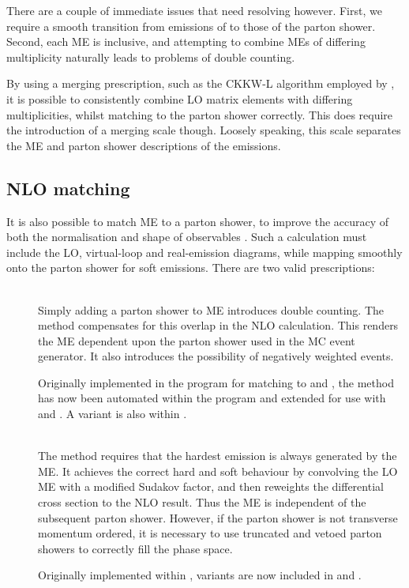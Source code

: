There are a couple of immediate issues that need resolving however. First, we require a 
smooth transition from emissions of  to those of the parton shower. Second, each 
\ac{ME} is inclusive, and attempting to combine \acp{ME} of differing multiplicity 
naturally leads to problems of double counting.

By using a merging prescription, such as the CKKW-L algorithm \cite{CKKW,Lonnblad:2002} 
employed by \sherpa, it is possible to consistently combine \ac{LO} matrix elements 
with differing multiplicities, whilst matching to the parton shower correctly. This does 
require the introduction of a merging scale though. Loosely speaking, this scale separates
the \ac{ME} and parton shower descriptions of the emissions.



\subsection{NLO matching}
\label{sec:mc:matching}

It is also possible to match  \ac{ME} to a parton shower, to improve the accuracy
of both the normalisation and shape of observables \cite{Nason:2012}. Such a calculation 
must include the \ac{LO}, virtual-loop and real-emission diagrams, while mapping smoothly 
onto the parton shower for soft emissions. There are two valid prescriptions:

\begin{description}
\item[\mcatnlo] \hfill \\
	Simply adding a parton shower to  \ac{ME} introduces double counting. The 
	\mcatnlo method compensates for this overlap in the \ac{NLO} calculation. This 
	renders the \ac{ME} dependent upon the parton shower used in the \ac{MC} event 
	generator. It also introduces the possibility of negatively weighted events.

	Originally implemented in the program \mcatnlo for matching to \fherwig 
	\cite{MCatNLO-Herwig} and \herwigpp \cite{MCatNLO-Herwig++}, the method has now been 
	automated within the \amcatnlo program and extended for use with  and 
	 \cite{aMCatNLO,MCatNLO-Pythia}. A variant is also within \sherpa.
\item[\powheg] \hfill \\
	The \powheg method requires that the hardest emission is always generated by the 
	\ac{ME}. It achieves the correct hard and soft behaviour by convolving the \ac{LO} 
	\ac{ME} with a modified Sudakov factor, and then reweights the differential cross 
	section to the \ac{NLO} result. Thus the \ac{ME} is independent of the subsequent 
	parton shower. However, if the parton shower is not transverse momentum ordered, it is
	necessary to use truncated and vetoed parton showers to correctly fill the phase 
	space.

	Originally implemented within \powhegbox 
	\cite{Powheg-method,Powheg-method2,PowhegBox}, variants are now included in \herwigpp 
	and \sherpa.
\end{description}

